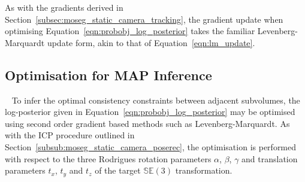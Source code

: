 As with the gradients derived in Section~\ref{subsec:moseg_static_camera_tracking}, the 
gradient update when optimising Equation~\ref{eqn:probobj_log_posterior} takes the familiar 
Levenberg-Marquardt update form, akin to that of Equation~\ref{eqn:lm_update}.

\subsection{Optimisation for MAP Inference}
~\label{subsec:probobj_map_optimisation}
To infer the optimal consistency constraints between adjacent subvolumes, the
log-posterior given in Equation~\ref{eqn:probobj_log_posterior} may be optimised
using second order gradient based methods such as Levenberg-Marquardt. As with
the ICP procedure outlined in Section~\ref{subsub:moseg_static_camera_poserec},
the optimisation is performed with respect to the three Rodrigues rotation
parameters \( \alpha \), \( \beta \), \( \gamma \) and translation parameters \(t_{x}\),
\(t_{y}\) and \(t_{z}\) of the target \(\mathbb{SE}(3)\) transformation.

